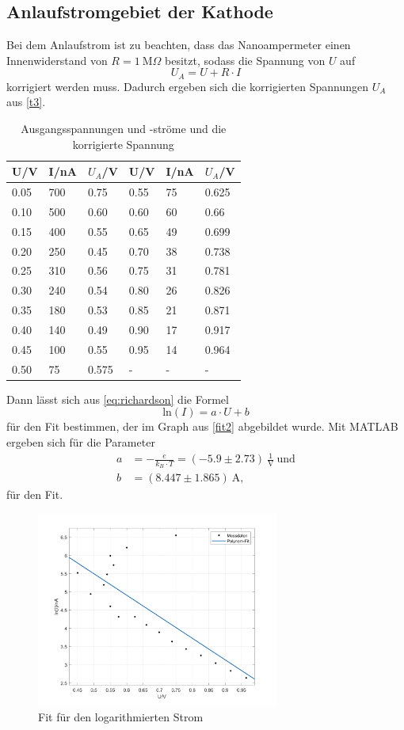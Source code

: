  \subsection{Anlaufstromgebiet der Kathode}
 \label{sec:t1}
 Bei dem Anlaufstrom ist zu beachten, dass das Nanoampermeter einen Innenwiderstand von $R=1\ \textrm{M}\Omega$ besitzt, sodass die Spannung von $U$ auf
 \begin{equation*}
   U_{A}=U+R\cdot I
 \end{equation*}
 korrigiert werden muss. Dadurch ergeben sich die korrigierten Spannungen $U_{A}$ aus \autoref{t3}.
 \begin{table}[H]
 \centering
 \caption{Ausgangsspannungen und -ströme und die korrigierte Spannung}
 \begin{tabular}{l|l|l|l|l|l}
 U/V & I/nA & $U_{A}$/V & U/V & I/nA & $U_{A}$/V\\\hline
 0.05 & 700 & 0.75 & 0.55 & 75 & 0.625\\
 0.10 & 500 & 0.60 & 0.60 & 60 & 0.66\\
 0.15 & 400 & 0.55 & 0.65 & 49 & 0.699\\
 0.20 & 250 & 0.45 & 0.70 & 38 & 0.738\\
 0.25 & 310 & 0.56 & 0.75 & 31 & 0.781\\
 0.30 & 240 & 0.54 & 0.80 & 26 & 0.826\\
 0.35 & 180 & 0.53 & 0.85 & 21 & 0.871\\
 0.40 & 140 & 0.49 & 0.90 & 17 & 0.917\\
 0.45 & 100 & 0.55 & 0.95 & 14 & 0.964\\
 0.50 & 75 & 0.575 & - & - & -\\\hline
 \end{tabular}
 \label{t3}
 \end{table}
 Dann lässt sich aus \eqref{eq:richardson} die Formel 
 \begin{equation*}
   \textrm{ln}(I)=a\cdot U+b
 \end{equation*}
 für den Fit bestimmen, der im Graph aus \autoref{fit2} abgebildet wurde. Mit MATLAB ergeben sich für die Parameter
 \begin{align*}
   a&=-\frac{e}{k_{B}\cdot T}=(-5.9 \pm 2.73)\ \frac{1}{\textrm{V}}\ \textrm{und}\\
   b&=(8.447 \pm 1.865)\ \textrm{A},
 \end{align*}
 für den Fit.
 \begin{figure}[H]
 \centering
 \includegraphics[width=8cm]{content/linfit.png}
 \caption{Fit für den logarithmierten Strom}
 \label{fit2}
 \end{figure}
